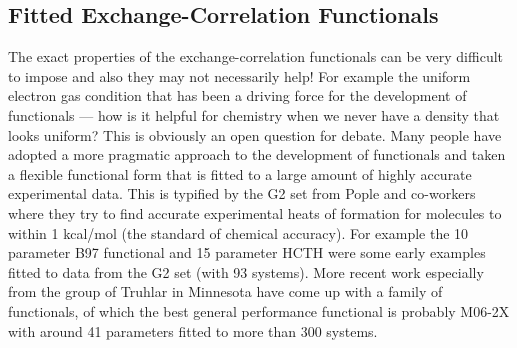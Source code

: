 \documentclass{article}
\theoremstyle{plain}\theoremheaderfont{\normalfont\itshape}\theorembodyfont{\rmfamily}\theoremseparator{.}\newtheorem*{rem}{Remark}\newtheorem*{ex}{Example}\newtheorem*{proof}{Proof}\newtheorem*{altp}{Alternative proof}
\theoremstyle{plain}\theoremheaderfont{\normalfont\bfseries}\theorembodyfont{\rmfamily}\theoremseparator{.}\newtheorem{thm}{Theorem}[section]\newtheorem{lem}[thm]{Lemma}\newtheorem{prop}[thm]{Proposition}\newtheorem*{cor}{Corollary}\newtheorem{defn}[thm]{Definition}\newtheorem{clm}[thm]{Claim}\newtheorem{clminproof}{Claim}
\theoremstyle{break}\theoremheaderfont{\normalfont\itshape}\theorembodyfont{\rmfamily}\theoremseparator{.\medskip}\newtheorem*{proofskip}{Proof}\newtheorem*{exs}{Examples}\newtheorem*{rems}{Remarks}
\theoremstyle{break}\theoremheaderfont{\normalfont\bfseries}\theorembodyfont{\rmfamily}\theoremseparator{.\medskip}\newtheorem{lemskip}[thm]{Lemma}\newtheorem{defnskip}[thm]{Definition}\newtheorem{propskip}[thm]{Proposition}\newtheorem{thmskip}[thm]{Theorem}
\numberwithin{equation}{section}
\begin{document}
    \subsection{Fitted Exchange-Correlation Functionals}
    The exact properties of the exchange-correlation functionals can be very difficult to impose and also they may not necessarily help! For example the uniform electron gas condition that has been a driving force for the development of functionals --- how is it helpful for chemistry when we never have a density that looks uniform? This is obviously an open question for debate. Many people have adopted a more pragmatic approach to the development of functionals and taken a flexible functional form that is fitted to a large amount of highly accurate experimental data. This is typified by the G2 set from Pople and co-workers where they try to find accurate experimental heats of formation for molecules to within 1 kcal/mol (the standard of chemical accuracy). For example the 10 parameter B97 functional and 15 parameter HCTH were some early examples fitted to data from the G2 set (with 93 systems). More recent work especially from the group of Truhlar in Minnesota have come up with a family of functionals, of which the best general performance functional is probably M06-2X with around 41 parameters fitted to more than 300 systems.
\end{document}
